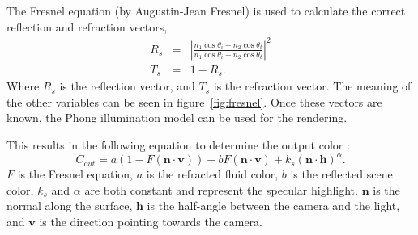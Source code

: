 The Fresnel equation (by Augustin-Jean Fresnel) is used to calculate the correct reflection and refraction vectors,
\begin{eqnarray}
	R_s &=& \left\vert \frac{n_1 \cos \theta_i - n_2 \cos \theta_t}{n_1 \cos \theta_i + n_2 \cos \theta_t} \right\vert ^2 \\
	T_s &=& 1 - R_s.
\end{eqnarray}
Where $R_s$ is the reflection vector, and $T_s$ is the refraction vector.
The meaning of the other variables can be seen in figure~\ref{fig:fresnel}.
Once these vectors are known, the Phong \cite{phong1975illumination} illumination model can be used for the rendering.

This results in the following equation to determine the output color \cite{van2009screen}:
\begin{equation}
\label{eq:shading}
C_{out} = a(1 - F(\mathbf{n} \cdot \mathbf{v})) + bF(\mathbf{n} \cdot \mathbf{v}) + k_s(\mathbf{n} \cdot \mathbf{h})^\alpha.
\end{equation}
$F$ is the Fresnel equation, $a$ is the refracted fluid color, $b$ is the reflected scene color, $k_s$ and $\alpha$ are both constant and represent the specular highlight. $\mathbf{n}$ is the normal along the surface, $\mathbf{h}$ is the half-angle between the camera and the light, and $\mathbf{v}$ is the direction pointing towards the camera.
